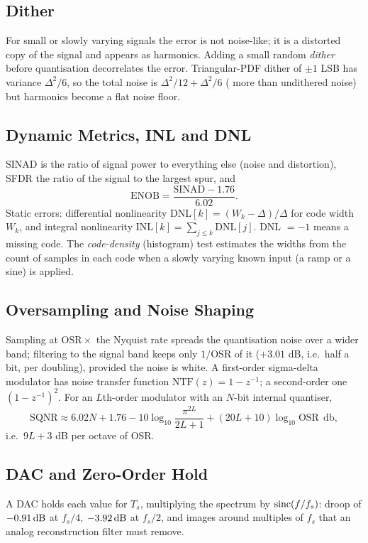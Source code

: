 \documentclass[11pt,a4paper]{article}
\begin{document}
\subsection{Dither}
For small or slowly varying signals the error is not noise-like; it is a distorted copy of the signal and appears as harmonics. Adding a small random \emph{dither} before quantisation decorrelates the error. Triangular-PDF dither of $\pm1$ LSB has variance $\Delta^2/6$, so the total noise is $\Delta^2/12+\Delta^2/6$ ( more than undithered noise) but harmonics become a flat noise floor.

\subsection{Dynamic Metrics, INL and DNL}
SINAD is the ratio of signal power to everything else (noise and distortion), SFDR the ratio of the signal to the largest spur, and
\begin{equation}
  \mathrm{ENOB}=\frac{\mathrm{SINAD}-1.76}{6.02}.
  \label{eq:enob}
\end{equation}
Static errors: differential nonlinearity DNL$[k]=(W_k-\Delta)/\Delta$ for code width $W_k$, and integral nonlinearity INL$[k]=\sum_{j\le k}\mathrm{DNL}[j]$. DNL $=-1$ means a missing code. The \emph{code-density} (histogram) test estimates the widths from the count of samples in each code when a slowly varying known input (a ramp or a sine) is applied.

\subsection{Oversampling and Noise Shaping}
Sampling at $\mathrm{OSR}\times$ the Nyquist rate spreads the quantisation noise over a wider band; filtering to the signal band keeps only $1/\mathrm{OSR}$ of it ($+3.01$ dB, i.e.\ half a bit, per doubling), provided the noise is white. A first-order sigma-delta modulator has noise transfer function $\mathrm{NTF}(z)=1-z^{-1}$; a second-order one $(1-z^{-1})^2$. For an $L$th-order modulator with an $N$-bit internal quantiser,
\begin{equation}
  \mathrm{SQNR}\approx6.02N+1.76-10\log_{10}\!\frac{\pi^{2L}}{2L+1}+(20L+10)\log_{10}\mathrm{OSR}\ \ \si{\decibel},
  \label{eq:sd}
\end{equation}
i.e.\ $9L+3$ dB per octave of OSR.

\subsection{DAC and Zero-Order Hold}
A DAC holds each value for $T_s$, multiplying the spectrum by $\operatorname{sinc}(f/f_s)$: droop of $\dB{-0.91}$ at $f_s/4$, $\dB{-3.92}$ at $f_s/2$, and images around multiples of $f_s$ that an analog reconstruction filter must remove.
\end{document}
